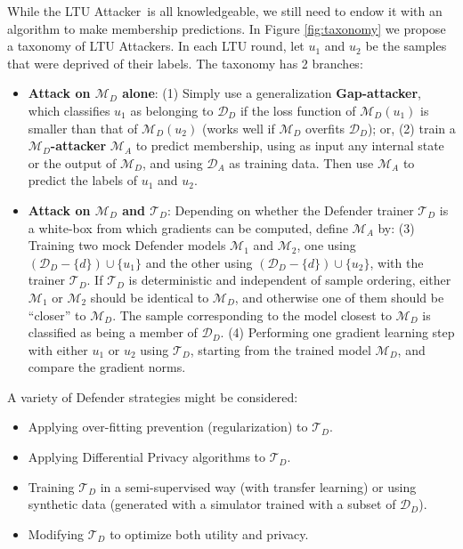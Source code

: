 \documentclass[letterpaper]{article}
\newcommand{\sminus}{-}
\newcommand{\oracle}{LTU Attacker~}
\begin{document}
While the \oracle is all knowledgeable, we still need to endow it with an algorithm to make membership predictions. In Figure \ref{fig:taxonomy} we propose a taxonomy of LTU Attackers. 
In each LTU round, let $u_1$ and $u_2$ be the samples that were deprived of their labels. The taxonomy has 2 branches:
\begin{itemize}
    \item {\bf  Attack on $\mathcal{M}_D$ alone}: (1) Simply use a generalization {\bf Gap-attacker}, which classifies $u_1$ as belonging to $\mathcal{D}_D$ if the loss function of $\mathcal{M}_D(u_1)$ is smaller than that of  $\mathcal{M}_D(u_2)$ (works well if  $\mathcal{M}_D$ overfits $\mathcal{D}_D$); or, 
    (2) train a {\bf $\mathcal{M}_D$-attacker} $\mathcal{M}_A$ to predict membership, using as input any internal state or the output of $\mathcal{M}_D$, and using $\mathcal{D}_A$ as training data. Then use $\mathcal{M}_A$ to predict the labels of $u_1$ and $u_2$.
    
    \item {\bf  Attack on $\mathcal{M}_D$ and $\mathcal{T}_D$}: Depending on whether the Defender trainer $\mathcal{T}_D$ is a white-box from which gradients can be computed, define  $\mathcal{M}_A$ by: (3) Training two mock Defender models $\mathcal{M}_1$ and $\mathcal{M}_2$, one using $(\mathcal{D}_D\sminus\{d\})\cup \{u_1\}$ and the other using $(\mathcal{D}_D\sminus\{d\})\cup \{u_2\}$, with the trainer $\mathcal{T}_D$. If $\mathcal{T}_D$ is deterministic and independent of sample ordering, either $\mathcal{M}_1$ or $\mathcal{M}_2$ should be identical to $\mathcal{M}_D$, and otherwise one of them should be ``closer'' to $\mathcal{M}_D$. The sample corresponding to the model closest to $\mathcal{M}_D$ is classified as being a member of $\mathcal{D}_D$. (4) Performing one gradient learning step with either $u_1$ or $u_2$ using $\mathcal{T}_D$, starting from the trained model $\mathcal{M}_D$, and compare the gradient norms.
\end{itemize}
A variety of Defender strategies might be considered:
\begin{itemize}
    \item Applying over-fitting prevention (regularization) to $\mathcal{T}_D$.
    \item Applying Differential Privacy algorithms to $\mathcal{T}_D$.
    \item Training $\mathcal{T}_D$ in a semi-supervised way (with transfer learning) or using synthetic data (generated with a simulator trained with a subset of $\mathcal{D}_D$).
    \item Modifying $\mathcal{T}_D$ to optimize both utility and privacy.
\end{itemize}
\end{document}
